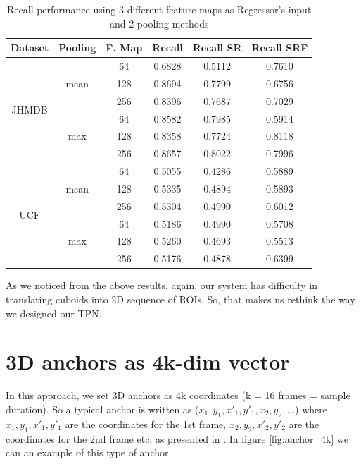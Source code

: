 \begin{table}[h]
  \centering
  \begin{tabular}{||c | c | c || c  c  c ||}
    \hline
    \textbf{Dataset} & \textbf{Pooling} & \textbf{F. Map} & \textbf{Recall} &  \textbf{ Recall SR}  &  \textbf{Recall SRF} \\
    \hline
    \multirow{6}{*}{JHMDB} & \multirow{3}{*}{mean} & 64 &  0.6828  & 0.5112  & 0.7610 \\
    \cline{3-6}
    {} & {} & 128 & 0.8694 & 0.7799 & 0.6756 \\
    \cline{3-6}
    {} & {} & 256 & 0.8396 & 0.7687 & 0.7029 \\
    \cline{2-6}
    {} & \multirow{3}{*}{max} & 64 &  0.8582 & 0.7985 & 0.5914\\
    \cline{3-6}
    {} & {} & 128 & 0.8358 & 0.7724 & 0.8118 \\
    \cline{3-6}
    {} & {} & 256 & 0.8657 & 0.8022 & 0.7996 \\
    \hline
    \multirow{6}{*}{UCF} & \multirow{3}{*}{mean} & 64 & 0.5055 & 0.4286 & 0.5889 \\
    \cline{3-6}
    {} & {} & 128 & 0.5335 & 0.4894 & 0.5893 \\
    \cline{3-6}
    {} & {} & 256 & 0.5304 & 0.4990 & 0.6012 \\
    \cline{2-6}
    {} & \multirow{3}{*}{max} & 64 & 0.5186 & 0.4990 & 0.5708 \\
    \cline{3-6}
    {} & {} & 128 & 0.5260 & 0.4693 & 0.5513 \\
    \cline{3-6}
    {} & {} & 256 & 0.5176 & 0.4878 & 0.6399 \\
    \hline

  \end{tabular}
  \caption{Recall performance using 3 different feature maps as Regressor's input and 2 pooling methods}
  \label{table:reg_1_2}
\end{table}

As we noticed from the above results, again, our system has difficulty in translating cuboids into 2D sequence of ROIs.
So, that makes us rethink the way we designed our TPN.


\section{ 3D anchors as 4k-dim vector}
In this approach, we set 3D anchors as 4k coordinates (k = 16 frames = sample duration). So a typical anchor is written as ($x_1, y_1, x'_1, y'_1, x_2, y_2, ...$)
where $x_1, y_1, x'_1, y'_1 $ are the coordinates for the 1st frame, $x_2, y_2, x'_2, y'_2$ are the coordinates for the 2nd frame etc, as presented in \cite{DBLP:journals/corr/abs-1712-09184}.
In figure \ref{fig:anchor_4k} we can an example of this type of anchor.


